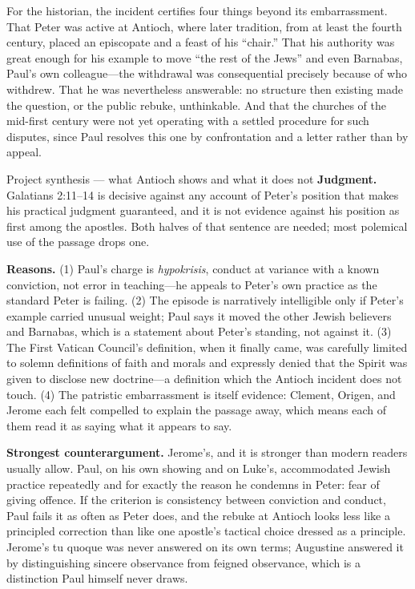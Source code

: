 For the historian, the incident certifies four things beyond its
embarrassment. That Peter was active at Antioch, where later tradition, from
at least the fourth century, placed an episcopate and a feast of his
``chair.'' That his authority was great enough for his example to move ``the
rest of the Jews'' and even Barnabas, Paul's own colleague---the withdrawal
was consequential precisely because of who withdrew. That he was
nevertheless answerable: no structure then existing made the question, or the
public rebuke, unthinkable. And that the churches of the mid-first century
were not yet operating with a settled procedure for such disputes, since Paul
resolves this one by confrontation and a letter rather than by appeal.

\begin{studybox}{Project synthesis --- what Antioch shows and what it does not}
\textbf{Judgment.} Galatians 2:11--14 is decisive against any account of
Peter's position that makes his practical judgment guaranteed, and it is not
evidence against his position as first among the apostles. Both halves of
that sentence are needed; most polemical use of the passage drops one.

\textbf{Reasons.} (1) Paul's charge is \textit{hypokrisis}, conduct at
variance with a known conviction, not error in teaching---he appeals to
Peter's own practice as the standard Peter is failing. (2) The episode is
narratively intelligible only if Peter's example carried unusual weight;
Paul says it moved the other Jewish believers and Barnabas, which is a
statement about Peter's standing, not against it. (3) The First Vatican
Council's definition, when it finally came, was carefully limited to
solemn definitions of faith and morals and expressly denied that the Spirit
was given to disclose new doctrine---a definition which the Antioch incident
does not touch. (4) The patristic embarrassment is itself evidence: Clement,
Origen, and Jerome each felt compelled to explain the passage away, which
means each of them read it as saying what it appears to say.

\textbf{Strongest counterargument.} Jerome's, and it is stronger than modern
readers usually allow. Paul, on his own showing and on Luke's, accommodated
Jewish practice repeatedly and for exactly the reason he condemns in Peter:
fear of giving offence. If the criterion is consistency between conviction
and conduct, Paul fails it as often as Peter does, and the rebuke at Antioch
looks less like a principled correction than like one apostle's tactical
choice dressed as a principle. Jerome's tu quoque was never answered on its
own terms; Augustine answered it by distinguishing sincere observance from
feigned observance, which is a distinction Paul himself never draws.


\end{studybox}
